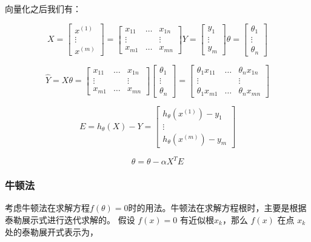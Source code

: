 \documentclass{ML}
\begin{document}
向量化之后我们有：

$$X = \begin{bmatrix}
		x^{(1)} \\
		⋮       \\
		x^{(m)}
	\end{bmatrix} = \begin{bmatrix}
		x_{11} & \dots & x_{1n} \\
		⋮      &       & ⋮      \\
		x_{m1} & \dots & x_{mn}
	\end{bmatrix}
	Y = \begin{bmatrix}
		y_1 \\
		⋮   \\
		y_m
	\end{bmatrix}
	θ = \begin{bmatrix}
		θ_1 \\
		⋮   \\
		θ_n
	\end{bmatrix}$$

$$\hat{Y} = X θ = \begin{bmatrix}
		x_{11} & \dots & x_{1n} \\
		⋮      &       & ⋮      \\
		x_{m1} & \dots & x_{mn}
	\end{bmatrix} \begin{bmatrix}
		θ_1 \\
		⋮   \\
		θ_n
	\end{bmatrix} = \begin{bmatrix}
		θ_1x_{11} & \dots & θ_nx_{1n} \\
		⋮         &       & ⋮         \\
		θ_1x_{m1} & \dots & θ_nx_{mn}
	\end{bmatrix}
$$

$$E = h_θ(X) - Y = \begin{bmatrix}
		h_θ(x^{(1)})-y_1 \\
		⋮                \\
		h_θ(x^{(m)}) - y_m
	\end{bmatrix}$$

$$θ = θ - αX^TE$$

\subsubsection{牛顿法}

考虑牛顿法在求解方程$f(\theta)=0$时的用法。牛顿法在求解方程根时，主要是根据泰勒展示式进行迭代求解的。 假设 $f(x)=0$ 有近似根$x_k$，那么 $f(x)$ 在点 $x_k$ 处的泰勒展开式表示为，
\end{document}
